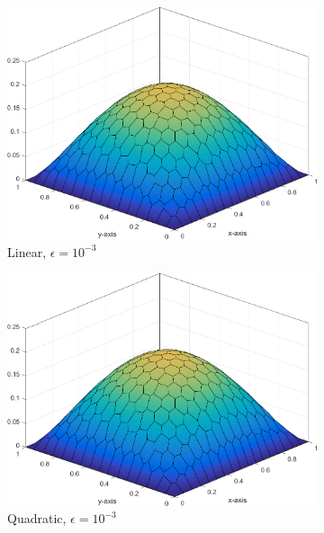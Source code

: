 \begin{figure}
{	\begin{subfigure}[b]{0.465\textwidth}
		\centering
		\label{subfig::DL_trans_mv1_e3}
		\includegraphics[width=\textwidth]{figures/sec_BF/Sq_poly_MV_k=1_ep=1e-3.png}
		\caption{Linear, $\epsilon = 10^{-3}$}
	\end{subfigure}
	\hfill
	\begin{subfigure}[b]{0.465\textwidth}
		\centering
		\label{subfig::DL_trans_mv2_e3}
		\includegraphics[width=\textwidth]{figures/sec_BF/Sq_poly_MV_k=2_ep=1e-3.png}
		\caption{Quadratic, $\epsilon = 10^{-3}$}
	\end{subfigure}
}
{
	\vspace{3mm}
	\begin{subfigure}[b]{0.465\textwidth}

\end{subfigure}}
\end{figure}
